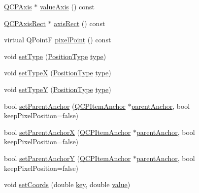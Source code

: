 \begin{DoxyCompactItemize}
\item 
\hyperlink{classQCPAxis}{Q\+C\+P\+Axis} $\ast$ \hyperlink{classQCPItemPosition_a8d3a039fb2e69df86b4015daa30dfd2d}{value\+Axis} () const 
\item 
\hyperlink{classQCPAxisRect}{Q\+C\+P\+Axis\+Rect} $\ast$ \hyperlink{classQCPItemPosition_a7f10fa702a324880cc4de958f434cec7}{axis\+Rect} () const 
\item 
virtual Q\+PointF \hyperlink{classQCPItemPosition_ae490f9c76ee2ba33752c495d3b6e8fb5}{pixel\+Point} () const 
\item 
void \hyperlink{classQCPItemPosition_aa476abf71ed8fa4c537457ebb1a754ad}{set\+Type} (\hyperlink{classQCPItemPosition_aad9936c22bf43e3d358552f6e86dbdc8}{Position\+Type} \hyperlink{classQCPItemPosition_aecb709d72c9aa334a7f62e2c9e0b5d60}{type})
\item 
void \hyperlink{classQCPItemPosition_a2113b2351d6d00457fb3559a4e20c3ea}{set\+TypeX} (\hyperlink{classQCPItemPosition_aad9936c22bf43e3d358552f6e86dbdc8}{Position\+Type} \hyperlink{classQCPItemPosition_aecb709d72c9aa334a7f62e2c9e0b5d60}{type})
\item 
void \hyperlink{classQCPItemPosition_ac2a454aa5a54c1615c50686601ec4510}{set\+TypeY} (\hyperlink{classQCPItemPosition_aad9936c22bf43e3d358552f6e86dbdc8}{Position\+Type} \hyperlink{classQCPItemPosition_aecb709d72c9aa334a7f62e2c9e0b5d60}{type})
\item 
bool \hyperlink{classQCPItemPosition_ac094d67a95d2dceafa0d50b9db3a7e51}{set\+Parent\+Anchor} (\hyperlink{classQCPItemAnchor}{Q\+C\+P\+Item\+Anchor} $\ast$\hyperlink{classQCPItemPosition_a7b4ffab9946945c0e11cd2352dc2e042}{parent\+Anchor}, bool keep\+Pixel\+Position=false)
\item 
bool \hyperlink{classQCPItemPosition_add71461a973927c74e42179480916d9c}{set\+Parent\+AnchorX} (\hyperlink{classQCPItemAnchor}{Q\+C\+P\+Item\+Anchor} $\ast$\hyperlink{classQCPItemPosition_a7b4ffab9946945c0e11cd2352dc2e042}{parent\+Anchor}, bool keep\+Pixel\+Position=false)
\item 
bool \hyperlink{classQCPItemPosition_add5ec1db9d19cec58a3b5c9e0a0c3f9d}{set\+Parent\+AnchorY} (\hyperlink{classQCPItemAnchor}{Q\+C\+P\+Item\+Anchor} $\ast$\hyperlink{classQCPItemPosition_a7b4ffab9946945c0e11cd2352dc2e042}{parent\+Anchor}, bool keep\+Pixel\+Position=false)
\item 
void \hyperlink{classQCPItemPosition_aa988ba4e87ab684c9021017dcaba945f}{set\+Coords} (double \hyperlink{classQCPItemPosition_ac3cb2bddf5f89e5181830be30b93d090}{key}, double \hyperlink{classQCPItemPosition_a6817f7356d3a2b63e8446c6b6106dae1}{value})

\end{DoxyCompactItemize}
